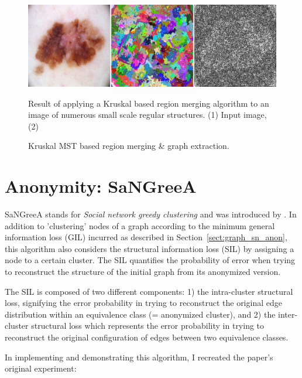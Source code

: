 	\begin{figure}[H]
		\begin{center}
			\includegraphics [width=1\textwidth] {figures/graph_ext}
			\caption{Kruskal MST based region merging \& graph extraction.}
			\label{fig:graph_extract}
		\end{center}
		\small 
		Result of applying a Kruskal based region merging algorithm to an image of numerous small scale regular structures. (1) Input image, (2) 
		
	\end{figure}


\section{Anonymity: SaNGreeA}
\label{sect:aoa_anonymization}

	SaNGreeA stands for \textit{Social network greedy clustering} and was introduced by \cite{campan2009data}. In addition to 'clustering' nodes of a graph according to the minimum general information loss (GIL) incurred as described in Section~\ref{sect:graph_sn_anon}, this algorithm also considers the structural information loss (SIL) by assigning a node to a certain cluster. The SIL quantifies the probability of error when trying to reconstruct the structure of the initial graph from its anonymized version.
	
	The SIL is composed of two different components: 1) the intra-cluster structural loss, signifying the error probability in trying to reconstruct the original edge distribution within an equivalence class (= anonymized cluster), and 2) the inter-cluster structural loss which represents the error probability in trying to reconstruct the original configuration of edges between two equivalence classes.
	
	In implementing and demonstrating this algorithm, I recreated the paper's original experiment:

